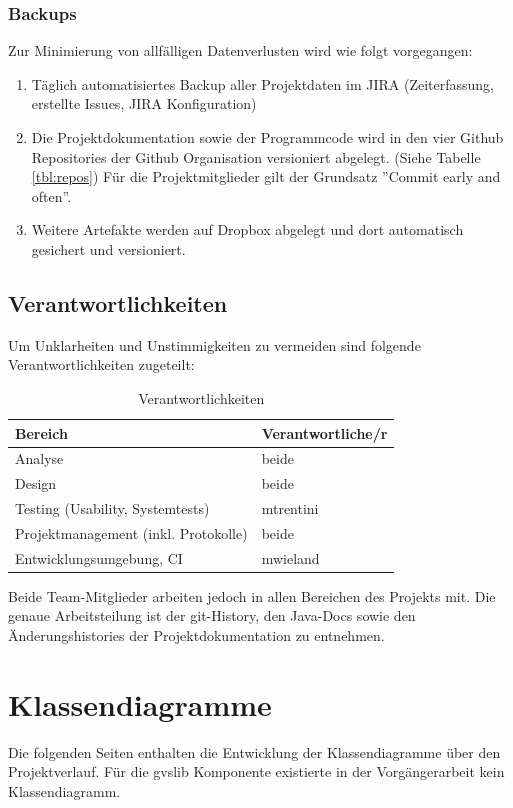 \documentclass[11pt,a4paper,english,oneside]{book}
\numberwithin{equation}{chapter}
\begin{document}
	\subsection{Backups}
	\label{sec:backup}
	Zur Minimierung von allfälligen Datenverlusten wird wie folgt vorgegangen:
	
	\begin{enumerate}
		\item Täglich automatisiertes Backup aller Projektdaten im JIRA \cite{jira} (Zeiterfassung, erstellte Issues, JIRA Konfiguration)
		\item Die Projektdokumentation sowie der Programmcode wird in den vier Github Repositories der Github Organisation \cite{github} versioniert abgelegt. (Siehe Tabelle \ref{tbl:repos}) Für die Projektmitglieder gilt der Grundsatz ''Commit early and often''.
		\item Weitere Artefakte werden auf Dropbox \cite{dropbox} abgelegt und dort automatisch gesichert und versioniert.
	\end{enumerate}
	
	
	
	\section{Verantwortlichkeiten}
	Um Unklarheiten und Unstimmigkeiten zu vermeiden sind folgende Verantwortlichkeiten zugeteilt:
	
	\begin{table}[h!]
		\centering
		\begin{tabular}{l l}
			\toprule 
			Bereich & Verantwortliche/r \\
			\toprule 
			Analyse & beide \\
			Design & beide \\ 
			Testing (Usability, Systemtests) & mtrentini \\
			Projektmanagement (inkl. Protokolle) & beide \\
			Entwicklungsumgebung, CI & mwieland \\
			\bottomrule 
		\end{tabular} 
		\caption{Verantwortlichkeiten} 
	\end{table}
	
	\noindent
	Beide Team-Mitglieder arbeiten jedoch in allen Bereichen des Projekts mit. 
	Die genaue Arbeitsteilung ist der git-History, den Java-Docs sowie den Änderungshistories der Projektdokumentation zu entnehmen.
	
	\chapter{Klassendiagramme} \label{ch:class-diagram}
	Die folgenden Seiten enthalten die Entwicklung der Klassendiagramme über den Projektverlauf. Für die \gls{gvslib} Komponente existierte in der Vorgängerarbeit kein Klassendiagramm.
	
\end{document}
